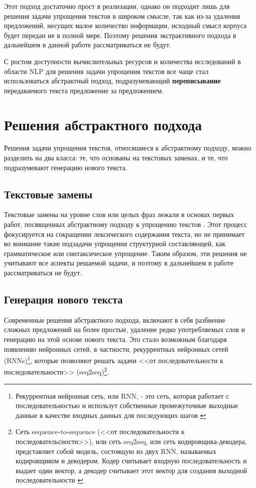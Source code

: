 Этот подход достаточно прост в реализации, однако он подходит лишь для решения задачи упрощения текстов в широком смысле, так как из-за удаления предложений, несущих малое количество информации, исходный смысл корпуса будет передан не в полной мере. Поэтому решения экстрактивного подхода в дальнейшем в данной работе рассматриваться не будут.

С ростом доступности вычислительных ресурсов и количества исследований в области NLP для решения задачи упрощения текстов все чаще стал использоваться абстрактный подход, подразумевающий \textbf{переписывание} передаваемого текста предложение за предложением\cite{see_get_2017}. 

\section{Решения абстрактного подхода}

Решения задачи упрощения текстов, относяшиеся к абстрактному подходу, можно разделить на два класса: те, что основаны на текстовых заменах, и те, что подразумевают генерацию нового текста.

\subsection{Текстовые замены}

Текстовые замены на уровне слов или целых фраз лежали в основах первых работ, посвященных абстрактному подходу к упрощению текстов \cite{paetzold_survey_2017}. Этот процесс фокусируется на сокращении лексического содержания текста, но не принимает во внимание такие подзадачи упрощения структурной составляющей, как грамматическое или синтаксическое упрощение\cite{shardlow_survey_2014}. Таким образом, эти решения не учитывают все аспекты решаемой задачи, и поэтому в дальнейшем в работе рассматриваться не будут.

\subsection{Генерация нового текста}
Современные решения абстрактного подхода,  включают в себя разбиение сложных предложений на более простые, удаление редко употребляемых слов и генерацию на этой основе нового текста. Это стало возможным благодаря появлению нейронных сетей, в частности, рекуррентных нейронных сетей (RNNs)\footnote{Рекуррентная нейронная сеть, или RNN, - это сеть, которая работает с последовательностью и использут собственные промежуточные выходные данные в качестве входных данных для последующих шагов \cite{noauthor_nlp_nodate}}, которые позволяют решать задачи <<от последовательности к последовательности>> (seq2seq)\footnote{Сеть sequence-to-sequence (<<от последовательности к последовательсности>>), или сеть seq2seq, или сеть кодировщика-декодера, представляет собой модель, состоящую из двух RNN, называемых кодировщиком и декодером. Кодер считывает входную последовательность и выдает один вектор, а декодер считывает этот вектор для создания выходной последовательности \cite{noauthor_nlp_nodate}}.

